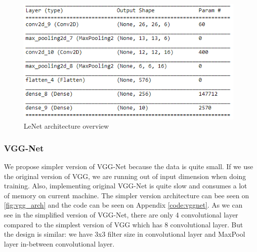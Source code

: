 \begin{figure}[h]
	\includegraphics[scale=0.5]{figures/lenet_arch}
	\centering
	\caption{LeNet architecture overview}
	\label{fig:lenet_arch}
\end{figure}

\subsubsection{VGG-Net}
We propose simpler version of VGG-Net because the data is quite small. If we use the original version of VGG, we are running out of input dimension when doing training. Also, implementing original VGG-Net is quite slow and consumes a lot of memory on current machine. The simpler version architecture can bee seen on \ref{fig:vgg_arch} and the code can be seen on Appendix \ref{code:vggnet}. As we can see in the simplified version of VGG-Net, there are only 4 convolutional layer compared to the simplest version of VGG which has 8 convolutional layer. But the design is similar: we have 3x3 filter size in convolutional layer and MaxPool layer in-between convolutional layer. 

